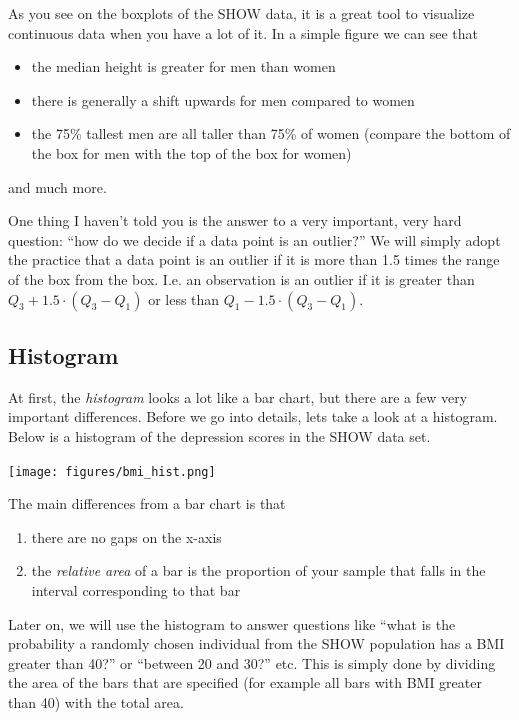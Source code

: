 \documentclass[]{book}
\providecommand{\tightlist}{%
  \setlength{\itemsep}{0pt}\setlength{\parskip}{0pt}}
\theoremstyle{definition}
\theoremstyle{definition}
\theoremstyle{definition}
\theoremstyle{remark}
\begin{document}
As you see on the boxplots of the SHOW data, it is a great tool to visualize continuous data when you have a lot of it. In a simple figure we can see that

\begin{itemize}
\tightlist
\item
  the median height is greater for men than women
\item
  there is generally a shift upwards for men compared to women
\item
  the 75\% tallest men are all taller than 75\% of women (compare the bottom of the box for men with the top of the box for women)
\end{itemize}

and much more.

One thing I haven't told you is the answer to a very important, very hard question: ``how do we decide if a data point is an outlier?'' We will simply adopt the practice that a data point is an outlier if it is more than 1.5 times the range of the box from the box. I.e. an observation is an outlier if it is greater than \(Q_3 + 1.5\cdot (Q_3 - Q_1)\) or less than \(Q_1 - 1.5\cdot (Q_3 - Q_1)\).

\hypertarget{histogram}{%
\subsection{Histogram}\label{histogram}}

At first, the \emph{histogram} looks a lot like a bar chart, but there are a few very important differences. Before we go into details, lets take a look at a histogram. Below is a histogram of the depression scores in the SHOW data set.

\texttt{[image: figures/bmi\_hist.png]}

The main differences from a bar chart is that

\begin{enumerate}
\def\labelenumi{\arabic{enumi}.}
\tightlist
\item
  there are no gaps on the x-axis
\item
  the \emph{relative area} of a bar is the proportion of your sample that falls in the interval corresponding to that bar
\end{enumerate}

Later on, we will use the histogram to answer questions like ``what is the probability a randomly chosen individual from the SHOW population has a BMI greater than 40?'' or ``between 20 and 30?'' etc. This is simply done by dividing the area of the bars that are specified (for example all bars with BMI greater than 40) with the total area.
\end{document}
